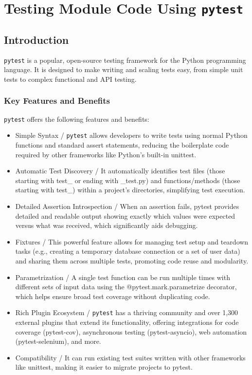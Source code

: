 \chapter{Testing Module Code Using \texttt{pytest}}

\section{Introduction}

\texttt{pytest} is a popular, open-source testing framework for the Python programming language. It is designed to make writing and scaling tests easy, from simple unit tests to complex functional and API testing. 

\subsection{Key Features and Benefits}

\texttt{pytest} offers the following features and benefits:

\begin{itemize}
  \item Simple Syntax / \texttt{pytest} allows developers to write tests using normal Python functions and standard assert statements, reducing the boilerplate code required by other frameworks like Python's built-in unittest.
  \item Automatic Test Discovery / It automatically identifies test files (those starting with test\_ or ending with \_test.py) and functions/methods (those starting with test\_) within a project's directories, simplifying test execution.
  \item Detailed Assertion Introspection / When an assertion fails, pytest provides detailed and readable output showing exactly which values were expected versus what was received, which significantly aids debugging.
  \item Fixtures / This powerful feature allows for managing test setup and teardown tasks (e.g., creating a temporary database connection or a set of user data) and sharing them across multiple tests, promoting code reuse and modularity.
  \item Parametrization / A single test function can be run multiple times with different sets of input data using the @pytest.mark.parametrize decorator, which helps ensure broad test coverage without duplicating code.
  \item Rich Plugin Ecosystem / \texttt{pytest} has a thriving community and over 1,300 external plugins that extend its functionality, offering integrations for code coverage (pytest-cov), asynchronous testing (pytest-asyncio), web automation (pytest-selenium), and more.
  \item Compatibility / It can run existing test suites written with other frameworks like unittest, making it easier to migrate projects to pytest. 
\end{itemize}

